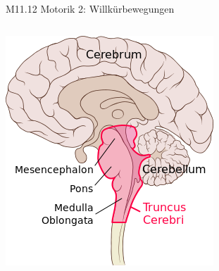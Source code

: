 \documentclass{beamer}
\begin{document}
\begin{frame}{M11.12 Motorik 2: Willkürbewegungen}
\begin{columns}[c]
\begin{column}{6.5cm}
\begin{columns}[c]
\begin{column}{2.5cm}
\begin{center}
    \includegraphics[width=0.8 \textwidth]{brain_stem.png}
\end{center}


\end{column}

\end{columns}

\pause

\begin{columns}[c]


\begin{column}{3cm}



\end{column}
\end{columns}
\end{column}
\end{columns}
\end{frame}
\end{document}
